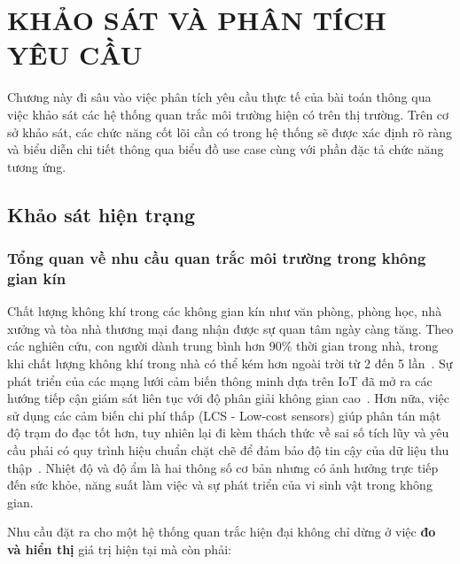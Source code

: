 \chapter{KHẢO SÁT VÀ PHÂN TÍCH YÊU CẦU}
\label{chap:survey}

Chương này đi sâu vào việc phân tích yêu cầu thực tế của bài toán thông
qua việc khảo sát các hệ thống quan trắc môi trường hiện có trên thị
trường. Trên cơ sở khảo sát, các chức năng cốt lõi cần có trong hệ
thống sẽ được xác định rõ ràng và biểu diễn chi tiết thông qua biểu đồ
use case cùng với phần đặc tả chức năng tương ứng.

\section{Khảo sát hiện trạng}
\label{sec:survey:status}

\subsection{Tổng quan về nhu cầu quan trắc môi trường trong không gian
kín}
\label{subsec:survey:need}

Chất lượng không khí trong các không gian kín như văn phòng, phòng học,
nhà xưởng và tòa nhà thương mại đang nhận được sự quan tâm ngày càng
tăng. Theo các nghiên cứu, con người dành trung bình hơn 90\% thời gian
trong nhà, trong khi chất lượng không khí trong nhà có thể kém hơn
ngoài trời từ 2 đến 5 lần~\cite{who2021air}. Sự phát triển của các mạng lưới
cảm biến thông minh dựa trên IoT đã mở ra các hướng tiếp cận giám sát liên
tục với độ phân giải không gian cao~\cite{saini2020indoor}. Hơn nữa, việc sử
dụng các cảm biến chi phí thấp (LCS - Low-cost sensors) giúp phân tán mật độ
trạm đo đạc tốt hơn, tuy nhiên lại đi kèm thách thức về sai số tích lũy và yêu cầu
phải có quy trình hiệu chuẩn chặt chẽ để đảm bảo độ tin cậy của dữ liệu thu
thập~\cite{kumar2015rise,margaritis2021calibration}. Nhiệt độ và độ ẩm là hai
thông số cơ bản nhưng có ảnh hưởng trực tiếp đến sức khỏe, năng suất
làm việc và sự phát triển của vi sinh vật trong không gian.

Nhu cầu đặt ra cho một hệ thống quan trắc hiện đại không chỉ dừng ở
việc \textbf{đo và hiển thị} giá trị hiện tại mà còn phải:

